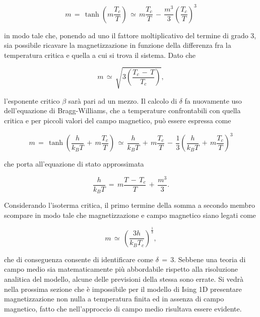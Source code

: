 \begin{equation}
    m\,=\,\tanh{\left(m\frac{T_c}{T}\right)}\,\simeq\,m\frac{T_c}{T}\,-\,\frac{m^3}{3}\left(\frac{T_c}{T}\right)^3
    \label{eq: beta_fp_Ising1D_MF}
\end{equation}

in modo tale che, ponendo ad uno il fattore moltiplicativo del termine di grado 3, sia possibile ricavare la 
magnetizzazione in funzione della differenza fra la temperatura critica e quella a cui si trova il sistema. Dato che 

\begin{equation}
    m\,\simeq\,\sqrt{3\left(\frac{T_c\,-\,T}{T_c}\right)}, 
    \label{eq: beta_sp_Ising1D_MF}
\end{equation}

l'esponente critico $\beta$ sarà pari ad un mezzo. Il calcolo di $\delta$ fa nuovamente uso dell'equazione di Bragg-Williams, che 
a temperature confrontabili con quella critica e per piccoli valori del campo magnetico, può essere espressa come 

\begin{equation}
    m\,=\,\tanh{\left(\frac{h}{k_BT}\,+\,m\frac{T_c}{T}\right)}\,\simeq\,\frac{h}{k_B T}\,+\,m\frac{T_c}{T}\,-\,\frac{1}{3}\left(\frac{h}{k_B T}\,+\,m\frac{T_c}{T}\right)^3
    \label{eq: delta_fp_Ising1D_MF}
\end{equation}

che porta all'equazione di stato approssimata 

\begin{equation}
    \frac{h}{k_B T}\,=\,m\frac{T\,-\,T_c}{T}\,+\,\frac{m^3}{3}.
    \label{eq: beta_sp_Ising1D_MF}
\end{equation}

Considerando l'isoterma critica, il primo termine della somma a secondo membro scompare in modo tale che magnetizzazione e 
campo magnetico siano legati come 

\begin{equation}
    m\,\simeq\,\left(\frac{3h}{k_B T_c}\right)^{\frac{1}{3}},
    \label{eq: beta_tp_Ising1D_MF}
\end{equation}

che di conseguenza consente di identificare come $\delta\,=\,3$. Sebbene una teoria di campo medio sia matematicamente più abbordabile 
rispetto alla risoluzione analitica del modello, alcune delle previsioni della stessa sono errate. Si vedrà nella prossima sezione che è 
impossibile per il modello di Ising 1D presentare magnetizzazione non nulla a temperatura finita ed in assenza di campo magnetico, 
fatto che nell'approccio di campo medio risultava essere evidente.





